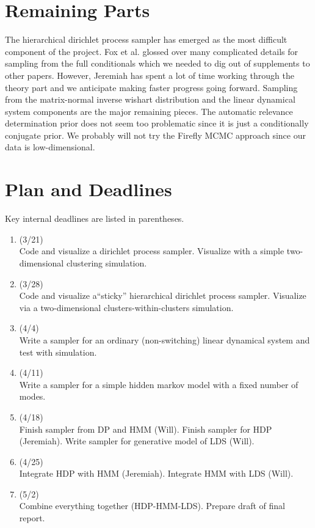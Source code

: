 \documentclass[12pt]{article}
\begin{document}
\section{Remaining Parts}
The hierarchical dirichlet process sampler has emerged as the most difficult component of the project. Fox et al. glossed over many complicated details for sampling from the full conditionals which we needed to dig out of supplements to other papers. However, Jeremiah has spent a lot of time working through the theory part and we anticipate making faster progress going forward. Sampling from the matrix-normal inverse wishart distribution and the linear dynamical system components are the major remaining pieces. The automatic relevance determination prior does not seem too problematic since it is just a conditionally conjugate prior. We probably will not try the Firefly MCMC approach since our data is low-dimensional.

\section{Plan and Deadlines}
Key internal deadlines are listed in parentheses.
\begin{enumerate}
\item (3/21) \\Code and visualize a dirichlet process sampler. Visualize with a simple two-dimensional clustering simulation.
\item (3/28) \\Code and visualize a``sticky'' hierarchical dirichlet process sampler. Visualize via a two-dimensional clusters-within-clusters simulation.
\item (4/4) \\Write a sampler for an ordinary (non-switching) linear dynamical system and test with simulation.
\item (4/11) \\Write a sampler for a simple hidden markov model with a fixed number of modes.
\item (4/18) \\Finish sampler from DP and HMM (Will). Finish sampler for HDP (Jeremiah). Write sampler for generative model of LDS (Will).
\item (4/25) \\Integrate HDP with HMM (Jeremiah). Integrate HMM with LDS (Will).
\item (5/2) \\Combine everything together (HDP-HMM-LDS). Prepare draft of final report.
\end{enumerate}
\end{document}

